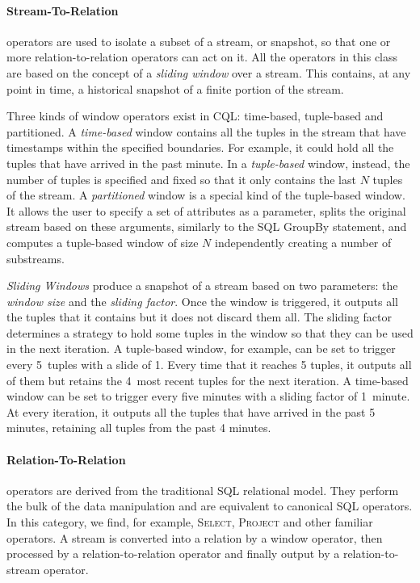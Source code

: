 \paragraph{Stream-To-Relation} operators are used to isolate a subset of a stream, or snapshot, so that
one or more relation-to-relation operators can act on it. All the operators in this class are based on
the concept of a \textit{sliding window} over a stream. This contains, at any point in time, a
historical snapshot of a finite portion of the stream. 

Three kinds of window operators exist in CQL: time-based, tuple-based and partitioned. A
\textit{time-based} window contains all the tuples in the stream that have timestamps within the
specified boundaries. For example, it could hold all the tuples that have arrived in the past minute. In
a \textit{tuple-based} window, instead, the number of tuples is specified and fixed so that it only
contains the last $N$ tuples of the stream. A \textit{partitioned} window is a special kind of the
tuple-based window. It allows the user to specify a set of attributes as a parameter, splits the
original stream based on these arguments, similarly to the SQL GroupBy statement, and computes a
tuple-based window of size $N$ independently creating a number of substreams.

\textit{Sliding Windows} produce a snapshot of a stream based on two parameters: the \textit{window size}
and the \textit{sliding factor}. Once the window is triggered, it outputs all the tuples that it
contains but it does not discard them all. The sliding factor determines a strategy to hold some tuples
in the window so that they can be used in the next iteration. A tuple-based window, for example, can be
set to trigger every 5~tuples with a slide of 1. Every time that it reaches 5 tuples, it outputs all of
them but retains the 4~most recent tuples for the next iteration. A time-based window can be set to
trigger every five minutes with a sliding factor of 1~minute. At every iteration, it outputs all the
tuples that have arrived in the past 5 minutes, retaining all tuples from the past 4 minutes. 

\paragraph{Relation-To-Relation} operators are derived from the traditional SQL relational model. They
perform the bulk of the data manipulation and are equivalent to canonical SQL operators. In this
category, we find, for example, \textsc{Select, Project} and other familiar operators. A stream is
converted into a relation by a window operator, then processed by a relation-to-relation operator and finally output by
a relation-to-stream operator.
      
